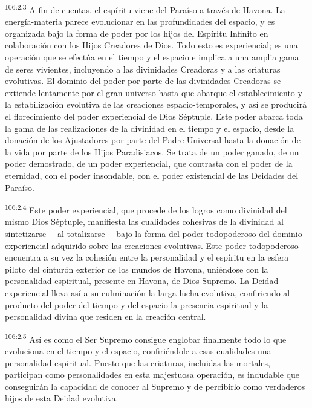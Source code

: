 \par
\textsuperscript{106:2.3} A fin de cuentas, el espíritu viene del Paraíso a través de Havona. La energía-materia parece evolucionar en las profundidades del espacio, y es organizada bajo la forma de poder por los hijos del Espíritu Infinito en colaboración con los Hijos Creadores de Dios. Todo esto es experiencial; es una operación que se efectúa en el tiempo y el espacio e implica a una amplia gama de seres vivientes, incluyendo a las divinidades Creadoras y a las criaturas evolutivas. El dominio del poder por parte de las divinidades Creadoras se extiende lentamente por el gran universo hasta que abarque el establecimiento y la estabilización evolutiva de las creaciones espacio-temporales, y así se producirá el florecimiento del poder experiencial de Dios Séptuple. Este poder abarca toda la gama de las realizaciones de la divinidad en el tiempo y el espacio, desde la donación de los Ajustadores por parte del Padre Universal hasta la donación de la vida por parte de los Hijos Paradisiacos. Se trata de un poder ganado, de un poder demostrado, de un poder experiencial, que contrasta con el poder de la eternidad, con el poder insondable, con el poder existencial de las Deidades del Paraíso.

\par
\textsuperscript{106:2.4} Este poder experiencial, que procede de los logros como divinidad del mismo Dios Séptuple, manifiesta las cualidades cohesivas de la divinidad al sintetizarse ---al totalizarse--- bajo la forma del poder todopoderoso del dominio experiencial adquirido sobre las creaciones evolutivas. Este poder todopoderoso encuentra a su vez la cohesión entre la personalidad y el espíritu en la esfera piloto del cinturón exterior de los mundos de Havona, uniéndose con la personalidad espiritual, presente en Havona, de Dios Supremo. La Deidad experiencial lleva así a su culminación la larga lucha evolutiva, confiriendo al producto del poder del tiempo y del espacio la presencia espiritual y la personalidad divina que residen en la creación central.

\par
\textsuperscript{106:2.5} Así es como el Ser Supremo consigue englobar finalmente todo lo que evoluciona en el tiempo y el espacio, confiriéndole a esas cualidades una personalidad espiritual. Puesto que las criaturas, incluidas las mortales, participan como personalidades en esta majestuosa operación, es indudable que conseguirán la capacidad de conocer al Supremo y de percibirlo como verdaderos hijos de esta Deidad evolutiva.

